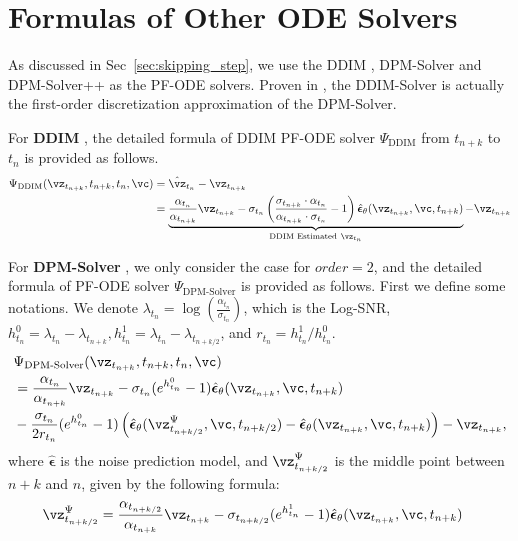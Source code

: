 \documentclass{article} %
\begin{document}
\section{Formulas of Other ODE Solvers \label{appendix:solvers}}

As discussed in Sec~\ref{sec:skipping_step}, we use the DDIM \citep{song2020denoising}, DPM-Solver \citep{lu2022dpm} and DPM-Solver++ \citep{lu2022dpm++} as the PF-ODE solvers. Proven in \citep{lu2022dpm}, the DDIM-Solver is actually the first-order discretization approximation of the DPM-Solver. 

For \textbf{DDIM} \citep{song2020denoising} , the detailed formula of DDIM PF-ODE solver $\Psi_{\text{DDIM}}$ from $t_{n+k}$ to $t_n$ is provided as follows.
\begin{equation}
    \begin{aligned}
    \Psi_{\text{DDIM}}(\vz_{t_{n+k}},t_{n+k}, t_n, \vc) & = \hat{\vz}_{t_{n}} - \vz_{t_{n+k}} \\
    & = \underbrace{\frac{\alpha_{t_n}}{\alpha_{t_{n+k}}}\vz_{t_{n+k}} - \sigma_{t_n}\left(\frac{\sigma_{t_{n+k}}\cdot\alpha_{t_n}}{\alpha_{t_{n+k}}\cdot\sigma_{t_n}} - 1\right)\hat{\boldsymbol{\epsilon}}_\theta(\vz_{t_{n+k}},\vc,t_{n+k})}_{\text{DDIM Estimated} \ \vz_{t_{n}}} - \vz_{t_{n+k}}
    \end{aligned}
\end{equation}

For \textbf{DPM-Solver} \citep{lu2022dpm}, we only consider the case for $order=2$, and the detailed formula of PF-ODE solver $\Psi_{\text{DPM-Solver}}$ is provided as follows. 
First we define some notations. 
We denote $\lambda_{t_n}=\log(\frac{\alpha_{t_n}}{\sigma_{t_n}})$, which is the Log-SNR, $h_{t_n}^0=\lambda_{t_n}-\lambda_{t_{n+k}}, h_{t_n}^1=\lambda_{t_n}-\lambda_{t_{n+k/2}}$, and $r_{t_n}= h_{t_n}^1 / h_{t_n}^0$.
\begin{equation}
    \begin{aligned}
    & \Psi_{\text{DPM-Solver}}(\vz_{t_{n+k}},t_{n+k}, t_n, \vc)  \\
    & = \frac{\alpha_{t_n}}{\alpha_{t_{n+k}}}\vz_{t_{n+k}} - \sigma_{t_n}(e^{h_{t_n}^0} - 1)\hat{\boldsymbol{\epsilon}}_\theta(\vz_{t_{n+k}},\vc,t_{n+k}) \\
    & - \frac{\sigma_{t_n}}{2r_{t_n}}(e^{h_{t_n}^0}-1)\left(\hat{\boldsymbol{\epsilon}}_\theta(\vz^\Psi_{t_{n+k/2}},\vc,t_{n+k/2})-\hat{\boldsymbol{\epsilon}}_\theta(\vz_{t_{n+k}},\vc,t_{n+k})\right) - \vz_{t_{n+k}},
    \end{aligned}
\end{equation}
where $\hat{\boldsymbol{\epsilon}}$ is the noise prediction model, and $\vz^\Psi_{t_{n+k/2}}$ is the middle point between $n+k$ and $n$, given by the following formula:
\begin{equation}
    \begin{aligned}
        \vz^\Psi_{t_{n+k/2}} &= \frac{\alpha_{t_{n+k/2}}}{\alpha_{t_{n+k}}}\vz_{t_{n+k}} - \sigma_{t_{n+k/2}}(e^{h_{t_n}^1} - 1)\hat{\boldsymbol{\epsilon}}_\theta(\vz_{t_{n+k}},\vc,t_{n+k})
    \end{aligned}
\end{equation}
\end{document}

